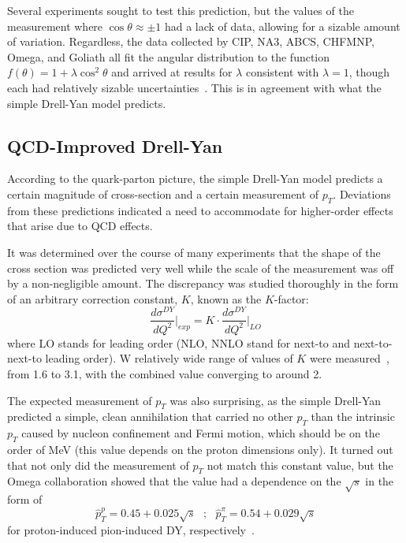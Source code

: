 Several experiments sought to test this prediction, but the values of the measurement where $\cos\theta \approx \pm 1$ had a lack of data, allowing for a sizable amount of variation. Regardless, the data collected by CIP, NA3, ABCS, CHFMNP, Omega, and Goliath all fit the angular distribution to the function $f(\theta)=1+\lambda\cos^2\theta$ and arrived at results for $\lambda$ consistent with $\lambda=1$, though each had relatively sizable uncertainties~\cite{Kenyon:1982tg}. This is in agreement with what the simple Drell-Yan model predicts.

\subsection{QCD-Improved Drell-Yan}

According to the quark-parton picture, the simple Drell-Yan model predicts a certain magnitude of cross-section and a certain measurement of $p_T$. Deviations from these predictions indicated a need to accommodate for higher-order effects that arise due to QCD effects. 

It was determined over the course of many experiments that the shape of the cross section was predicted very well while the scale of the measurement was off by a non-negligible amount. The discrepancy was studied thoroughly in the form of an arbitrary correction constant, $K$, known as the $K$-factor:
\begin{equation}
\frac{d\sigma^{DY}}{dQ^2}\bigr|_{exp} = K\cdot \frac{d\sigma^{DY}}{dQ^2}\bigr|_{LO}
\end{equation}
where LO stands for leading order (NLO, NNLO stand for next-to and next-to-next-to leading order). W relatively wide range of values of $K$ were measured~\cite{GrossoPilcher:1986nk}, from 1.6 to 3.1, with the combined value converging to around 2.

The expected measurement of $p_T$ was also surprising, as the simple Drell-Yan predicted a simple, clean annihilation that carried no other $p_T$ than the intrinsic $p_T$ caused by nucleon confinement and Fermi motion, which should be on the order of \unit[400]{MeV} (this value depends on the proton dimensions only). It turned out that not only did the measurement of $p_T$ not match this constant value, but the Omega collaboration showed that the value had a dependence on the $\sqrt{s}$ in the form of 
\begin{equation}
\hat{p}_T^p = 0.45 + 0.025 \sqrt{s}\ \ \ ; \ \ \ \hat{p}^\pi_T = 0.54 + 0.029 \sqrt{s}
\end{equation} for proton-induced pion-induced DY, respectively~\cite{Kenyon:1982tg}.

